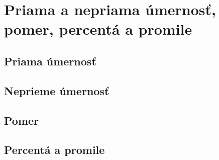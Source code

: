 \chapter{Priama a nepriama úmernosť, pomer, percentá a promile}


\section{Priama úmernosť}

\section{Neprieme úmernosť}

\section{Pomer}

\section{Percentá a promile}